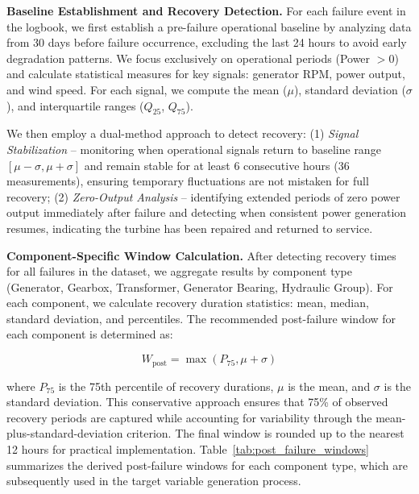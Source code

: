 \documentclass[12pt]{article}
\begin{document}
\textbf{Baseline Establishment and Recovery Detection.} For each failure event in the logbook, we first establish a pre-failure operational baseline by analyzing data from 30 days before failure occurrence, excluding the last 24 hours to avoid early degradation patterns. We focus exclusively on operational periods (Power $> 0$) and calculate statistical measures for key signals: generator RPM, power output, and wind speed. For each signal, we compute the mean ($\mu$), standard deviation ($\sigma$), and interquartile ranges ($Q_{25}$, $Q_{75}$).

We then employ a dual-method approach to detect recovery: (1) \textit{Signal Stabilization} -- monitoring when operational signals return to baseline range $[\mu - \sigma, \mu + \sigma]$ and remain stable for at least 6 consecutive hours (36 measurements), ensuring temporary fluctuations are not mistaken for full recovery; (2) \textit{Zero-Output Analysis} -- identifying extended periods of zero power output immediately after failure and detecting when consistent power generation resumes, indicating the turbine has been repaired and returned to service.

\textbf{Component-Specific Window Calculation.} After detecting recovery times for all failures in the dataset, we aggregate results by component type (Generator, Gearbox, Transformer, Generator Bearing, Hydraulic Group). For each component, we calculate recovery duration statistics: mean, median, standard deviation, and percentiles. The recommended post-failure window for each component is determined as:

\begin{equation}
W_{\text{post}} = \max(P_{75}, \mu + \sigma)
\end{equation}

where $P_{75}$ is the 75th percentile of recovery durations, $\mu$ is the mean, and $\sigma$ is the standard deviation. This conservative approach ensures that 75\% of observed recovery periods are captured while accounting for variability through the mean-plus-standard-deviation criterion. The final window is rounded up to the nearest 12 hours for practical implementation. Table~\ref{tab:post_failure_windows} summarizes the derived post-failure windows for each component type, which are subsequently used in the target variable generation process.
\end{document}
